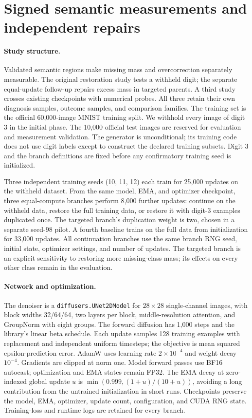 \section{Signed semantic measurements and independent repairs}
\label{supp:mnist}

\paragraph{Study structure.}
Validated semantic regions make missing mass and overcorrection separately
measurable. The original restoration study tests a withheld digit; the
separate equal-update follow-up repairs excess mass in targeted parents.
A third study crosses existing checkpoints with numerical probes. All three
retain their own diagnosis samples, outcome samples, and comparison families. The training
set is the official 60,000-image MNIST training split. We withhold every image
of digit 3 in the initial phase. The 10,000 official test images are reserved
for evaluation and measurement validation. The generator is unconditional;
its training code does not use digit labels except to construct the declared
training subsets. Digit 3 and the branch definitions are fixed before any
confirmatory training seed is initialized.

Three independent training seeds (10, 11, 12) each train for 25,000 updates on
the withheld dataset. From the same model, EMA, and optimizer checkpoint,
three equal-compute branches perform 8,000 further updates: continue on the
withheld data, restore the full training data, or restore it with digit-3
examples duplicated once. The targeted branch's duplication weight is two,
chosen in a separate seed-98 pilot. A fourth baseline trains on the full data
from initialization for 33,000 updates. All continuation branches use the
same branch RNG seed, initial state, optimizer settings, and number of updates.
The targeted branch is an explicit sensitivity to restoring more missing-class
mass; its effects on every other class remain in the evaluation.

\paragraph{Network and optimization.}
The denoiser is a \texttt{diffusers.UNet2DModel} for $28\times28$ single-channel
images, with block widths 32/64/64, two layers per block, middle-resolution
attention, and GroupNorm with eight groups. The forward diffusion has 1,000
steps and the library's linear beta schedule. Each update samples 128 training
examples with replacement and independent uniform timesteps; the objective is
mean squared epsilon-prediction error. AdamW uses learning rate $2\times10^{-4}$
and weight decay $10^{-4}$. Gradients are clipped at norm one. Model forward
passes use BF16 autocast; optimization and EMA states remain FP32. The EMA decay
at zero-indexed global update $u$ is
$\min(0.999,(1+u)/(10+u))$, avoiding a long contribution from the untrained
initialization in short runs. Checkpoints preserve the model, EMA, optimizer,
update count, configuration, and CUDA RNG state. Training-loss and runtime logs
are retained for every branch.

